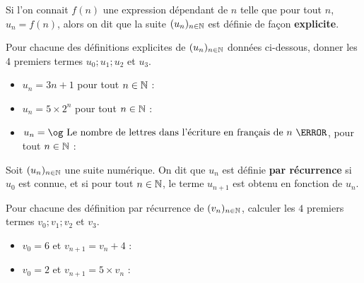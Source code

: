 \documentclass{poly}
\begin{document}
\begin{definition}
Si l'on connait $f(n)$ une expression dépendant de $n$ telle que pour tout $n$, $u_n = f(n)$, alors on dit que la suite $(u_n)_{n \in \mathbb{N}}$ est définie de façon \textbf{explicite}.
\end{definition}
\begin{example}
Pour chacune des définitions explicites de $(u_n)_{n \in \mathbb{N}}$ données ci-dessous, donner les 4 premiers termes $u_0; u_1; u_2$ et $u_3$.
\begin{itemize}
\item $u_n = 3n + 1$ pour tout $n \in \mathbb{N}$ : 
\item $u_n = 5 \times 2^n$ pour tout $n \in \mathbb{N}$ : 
\item $u_n = \text{\og Le nombre de lettres dans l'écriture en français de $n$ \fg}$, pour tout $n \in \mathbb{N}$ : 
\end{itemize}
\end{example}
\begin{definition}
Soit $(u_n)_{n \in \mathbb{N}}$ une suite numérique. On dit que $u_n$ est définie \textbf{par récurrence} si $u_0$ est connue, et si pour tout $n \in \mathbb{N}$, le terme $u_{n+1}$ est obtenu en fonction de $u_n$.  
\end{definition}
\begin{example}
Pour chacune des définition par récurrence de $(v_n)_{n \in \mathbb{N}}$, calculer les $4$ premiers termes $v_0; v_1; v_2$ et $v_3$.
\begin{itemize}
\item $v_0 = 6$ et $v_{n+1} = v_n + 4$ : 
\item $v_0 = 2$ et $v_{n+1} = 5 \times v_n$ :  
\end{itemize}
\end{example}
\newpage
\end{document}
